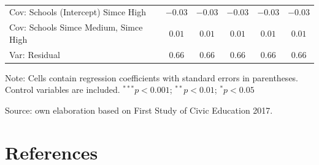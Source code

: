 \documentclass[
  12pt,
  letterpaper,
]{article}
\begin{document}
\begin{table}
{\begin{center}
{\begin{threeparttable}
\begin{tabular}{l c c c c c}
Cov: Schools (Intercept) Simce High       & $-0.03$       & $-0.03$       & $-0.03$       & $-0.03$       & $-0.03$       \\
Cov: Schools Simce Medium, Simce High     & $0.01$        & $0.01$        & $0.01$        & $0.01$        & $0.01$        \\
Var: Residual                             & $0.66$        & $0.66$        & $0.66$        & $0.66$        & $0.66$        \\
\bottomrule
\end{tabular}
\begin{tablenotes}[flushleft]
\scriptsize{\item Note: Cells contain regression coefficients with standard errors in parentheses. Control variables are included. $^{***}p<0.001$; $^{**}p<0.01$; $^{*}p<0.05$ \\ \item Source: own elaboration based on First Study of Civic Education 2017.}
\end{tablenotes}
\end{threeparttable}
}
\caption{}
\label{table:coefficients}
\end{center}

}

\end{table}%

\section*{References}\label{bibliography}
\end{document}
